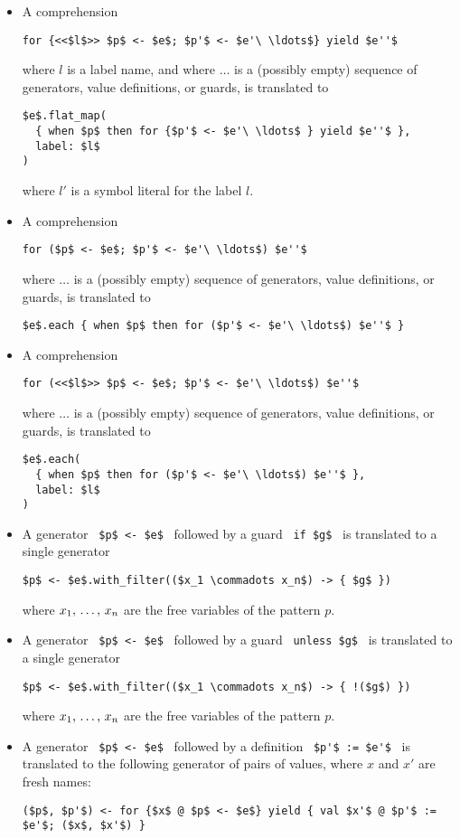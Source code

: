 \begin{itemize}
\item A comprehension 
\begin{lstlisting}
for {<<$l$>> $p$ <- $e$; $p'$ <- $e'\ \ldots$} yield $e''$
\end{lstlisting}
where $l$ is a label name, and where $\ldots$ is a (possibly empty) sequence of generators, value definitions, or guards, is translated to
\begin{lstlisting}[deletekeywords={label}]
$e$.flat_map(
  { when $p$ then for {$p'$ <- $e'\ \ldots$ } yield $e''$ },
  label: $l$
)
\end{lstlisting}
where $l'$ is a symbol literal for the label $l$. 

\item A comprehension 
\begin{lstlisting}
for ($p$ <- $e$; $p'$ <- $e'\ \ldots$) $e''$
\end{lstlisting}
where $\ldots$ is a (possibly empty) sequence of generators, value definitions, or guards, is translated to
\begin{lstlisting}
$e$.each { when $p$ then for ($p'$ <- $e'\ \ldots$) $e''$ }
\end{lstlisting}

\item A comprehension 
\begin{lstlisting}
for (<<$l$>> $p$ <- $e$; $p'$ <- $e'\ \ldots$) $e''$
\end{lstlisting}
where $\ldots$ is a (possibly empty) sequence of generators, value definitions, or guards, is translated to
\begin{lstlisting}[deletekeywords={label}]
$e$.each(
  { when $p$ then for ($p'$ <- $e'\ \ldots$) $e''$ },
  label: $l$
)
\end{lstlisting}

\item A generator ~\lstinline!$p$ <- $e$!~ followed by a guard ~\lstinline!if $g$!~ is translated to a single generator
\begin{lstlisting}
$p$ <- $e$.with_filter(($x_1 \commadots x_n$) -> { $g$ })
\end{lstlisting}
where $x_1 ,\, \ldots ,\, x_n$ are the free variables of the pattern $p$. 

\item A generator ~\lstinline!$p$ <- $e$!~ followed by a guard ~\lstinline!unless $g$!~ is translated to a single generator
\begin{lstlisting}
$p$ <- $e$.with_filter(($x_1 \commadots x_n$) -> { !($g$) })
\end{lstlisting}
where $x_1 ,\, \ldots ,\, x_n$ are the free variables of the pattern $p$. 

\item A generator ~\lstinline!$p$ <- $e$!~ followed by a definition ~\lstinline!$p'$ := $e'$!~ is translated to the following generator of pairs of values, where $x$ and $x'$ are fresh names:
\begin{lstlisting}
($p$, $p'$) <- for {$x$ @ $p$ <- $e$} yield { val $x'$ @ $p'$ := $e'$; ($x$, $x'$) }
\end{lstlisting}

\end{itemize}

